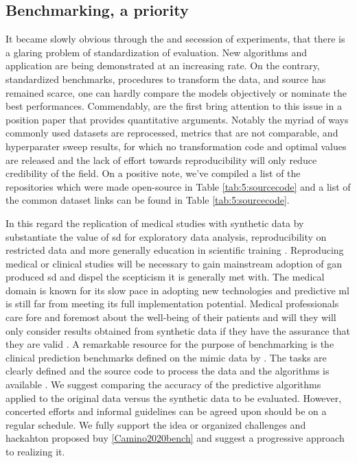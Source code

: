 \subsection{Benchmarking, a priority}
It became slowly obvious through the and secession of experiments, that there is a glaring problem of standardization of evaluation. New algorithms and application are being demonstrated at an increasing rate. On the contrary, standardized benchmarks, procedures to transform the data, and source has remained scarce, one can hardly compare the models objectively or nominate the best performances. Commendably, \citeauthor{Camino2020bench} are the first bring attention to this issue in a position paper that provides quantitative arguments. Notably the myriad of ways commonly used datasets are reprocessed, metrics that are not comparable, and hyperparater sweep results, for which no transformation code and optimal values are released and the lack of effort towards reproducibility will only reduce credibility of the field. On a positive note, we've compiled a list of the repositories which were made open-source in Table \ref{tab:5:sourcecode} and a list of the common dataset links can be found in Table \ref{tab:5:sourcecode}.\par
In this regard the replication of medical studies with synthetic data by \citeauthor{Yale_2020} substantiate the value of \gls{sd} for exploratory data analysis, reproducibility on restricted data and more generally education in scientific training \cite{Reiner_Benaim2020-lx}. Reproducing medical or clinical studies will be necessary to gain mainstream adoption of \gls{gan} produced \gls{sd} and dispel the scepticism it is generally met with. The medical domain is known for its slow pace in adopting new technologies and predictive \gls{ml} is still far from meeting its full implementation potential. Medical professionals care fore and foremost about the well-being of their patients and will they will only consider results obtained from synthetic data if they have the assurance that they are valid \cite{Rankin2020}.  A remarkable resource for the purpose of benchmarking is the clinical prediction benchmarks defined on the \gls{mimic} data by \citeauthor{harutyunyan_multitask_2019}. The tasks are clearly defined and the source code to process the data and the algorithms is available \cite{harutyunyan_multitask_2019}. We suggest comparing the accuracy of the predictive algorithms applied to the original data versus the synthetic data to be evaluated. However, concerted efforts and informal guidelines can be agreed upon should be on a regular schedule. We fully support the idea or organized challenges and hackahton proposed buy \ref{Camino2020bench} and suggest a progressive approach to realizing it.\par


